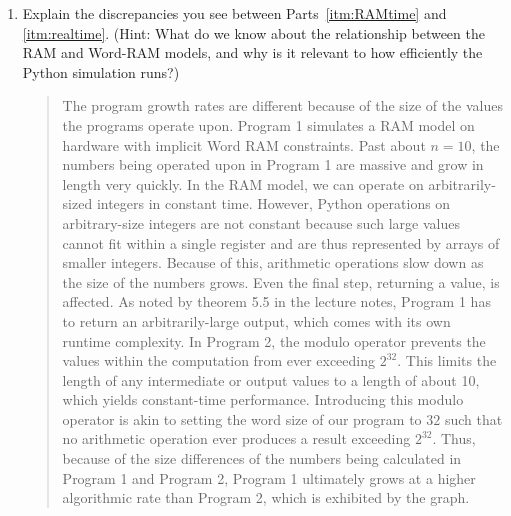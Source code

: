 \documentclass[11pt]{article}
\begin{document}
\begin{enumerate}
\begin{enumerate}
    \item Explain the discrepancies you see between Parts~\ref{itm:RAMtime} and \ref{itm:realtime}.  (Hint: What do we know about the relationship between the RAM and Word-RAM models, and why is it relevant to how efficiently the Python simulation runs?) 
    \begin{quote}
        \color{purple}
        The program growth rates are different because of the size of the values the programs operate upon. \newline 
        Program 1 simulates a RAM model on hardware with implicit Word RAM constraints. Past about $n = 10$, the numbers being operated upon in Program 1 are massive and grow in length very quickly. In the RAM model, we can operate on arbitrarily-sized integers in constant time. However, Python operations on arbitrary-size integers are not constant because such large values cannot fit within a single register and are thus represented by arrays of smaller integers. Because of this, arithmetic operations slow down as the size of the numbers grows. Even the final step, returning a value, is affected. As noted by theorem 5.5 in the lecture notes, Program 1 has to return an arbitrarily-large output, which comes with its own runtime complexity. \newline
        In Program 2, the modulo operator prevents the values within the computation from ever exceeding $2^{32}$. This limits the length of any intermediate or output values to a length of about 10, which yields constant-time performance. Introducing this modulo operator is akin to setting the word size of our program to $32$ such that no arithmetic operation ever produces a result exceeding $2^{32}$. \newline 
        Thus, because of the size differences of the numbers being calculated in Program 1 and Program 2, Program 1 ultimately grows at a higher algorithmic rate than Program 2, which is exhibited by the graph.
    \end{quote}
    

\end{enumerate}
\end{enumerate}
\end{document}
